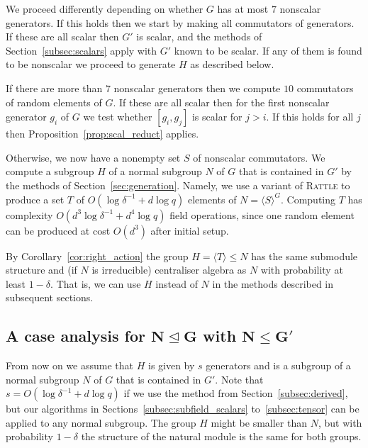 
We proceed differently depending on whether $G$ has at most $7$ 
nonscalar generators. If this holds then we start by making all 
commutators of generators. If these are all scalar then $G'$ is 
scalar, and the methods of Section~\ref{subsec:scalars} apply with $G'$ known to be scalar. If any of them is found to be nonscalar we proceed to generate $H$ as described below.

If there are more than $7$ nonscalar generators then we compute $10$
commutators of random elements of $G$. If these are all scalar 
then for the first nonscalar generator $g_i$ of $G$ we test 
whether $[g_i, g_j]$ is scalar for $j > i$. If this holds for 
all $j$ then Proposition~\ref{prop:scal_reduct} applies. 

Otherwise, we now have a nonempty set $S$ of nonscalar commutators. We 
compute a subgroup $H$ of a normal subgroup $N$ of $G$ 
that is contained in $G'$ by 
 the methods of Section~\ref{sec:generation}. 
Namely,  we use a variant of \textsc{Rattle} \cite{LGMurray, LGO97} to 
produce a set $T$ of $O(\log \delta^{-1} + d \log q)$ elements of 
$N = \langle S \rangle^G$. Computing $T$ has complexity 
$O(d^3 \log \delta^{-1} + d^4 \log q)$ 
field operations, since one random element can be produced
at cost $O(d^3)$ after initial setup.

By Corollary~\ref{cor:right_action} 
the group $H = \langle T \rangle \leq N$  has the 
same submodule structure and (if $N$ is irreducible) centraliser algebra 
as $N$ with probability at least $1 -
\delta$. That is, we can use $H$ instead of
$N$ in the methods described in subsequent sections.


\subsection{A case analysis for $\mathbf{N \unlhd G}$ with
$\mathbf{N \leq G'}$}
\label{subsec:caseanalysis}

{} From now on we assume that $H$ is given by $s$ generators 
and is a subgroup of a normal subgroup $N$ of $G$ that is
contained in $G'$.  Note that
$s = O(\log \delta^{-1} + d \log q)$ if we use the method from
Section~\ref{subsec:derived}, but our algorithms in 
Sections~\ref{subsec:subfield_scalars} to~\ref{subsec:tensor} can be applied 
to any normal subgroup. The group $H$ might be smaller than $N$, but with 
probability $1-\delta$ the structure of the natural module is the same for both
groups. 

